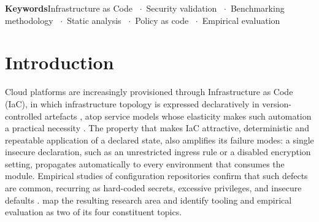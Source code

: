 \documentclass[smallextended]{svjour3}
\newcommand{\keywords}[1]{\par\smallskip\noindent\textbf{Keywords}\quad #1}
\providecommand{\and}{\unskip\ $\cdot$\ \ignorespaces}
\begin{document}
\begin{abstract}
moves apparent recall by 6.7 to 10.0 points among the source-level and
plan-level tools, and by 90.0 points for the repository-edge layer, promoting it
from last to second. The 23.3-point spread separating the four tools is larger,
but 8.5 points of it are attributable to two comparators reading none of the
Kubernetes resources three controls govern; on the subset those controls do not
touch, the spread is 14.8 points and the two effects are within a factor of
two. No pairwise difference survives correction; for three pairs no outcome
could have been significant, so we do not call them equivalent. A third-party
scanner, not our pipeline, attains the highest recall.
\textbf{Conclusion.} A comparison that does not state its matching criterion and
admissibility rule is not reproducible at any corpus size. The replication
package releases corpus, harness, and analysis code; every reported table there
is a generated artefact.
\end{abstract}

\keywords{Infrastructure as Code \and Security validation \and Benchmarking
methodology \and Static analysis \and Policy as code \and Empirical evaluation}

\section{Introduction}
\label{sec:intro}

Cloud platforms are increasingly provisioned through Infrastructure as Code
(IaC), in which infrastructure topology is expressed declaratively in
version-controlled artefacts \citep{morris2020infrastructure,
guerriero2019adoption}, atop service models whose elasticity makes such
automation a practical necessity \citep{armbrust2010view}. The property that
makes IaC attractive, deterministic and repeatable application of a declared
state, also amplifies its failure modes: a single insecure declaration, such as
an unrestricted ingress rule or a disabled encryption setting, propagates
automatically to every environment that consumes the module. Empirical studies of
configuration repositories confirm that such defects are common, recurring as
hard-coded secrets, excessive privileges, and insecure defaults
\citep{rahman2019sins, rahman2021replication, verdet2023exploring,
verdet2025adoption}. \citet{rahman2019mapping} map the resulting research area
and identify tooling and empirical evaluation as two of its four constituent
topics.
\end{document}
